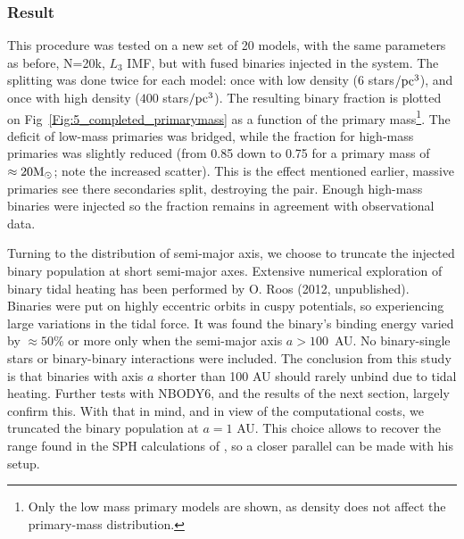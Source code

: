 \subsubsection*{Result}

This procedure was tested on a new set of 20 \HubLem models, with the same parameters as before, N=20k, $L_3$ IMF, but with fused binaries injected in the system. The splitting was done twice for each model:  once with low density ($6$ stars$/{\textrm{pc}}^3$), and once with high density ($ 400$ stars$/{\textrm{pc}}^3$). The resulting binary fraction is plotted on Fig~\ref{Fig:5_completed_primarymass} as a function of the primary mass\footnote{Only the low mass primary models are shown, as density does not affect the primary-mass distribution.}. The deficit of low-mass primaries was bridged, while the fraction for high-mass primaries was slightly reduced (from 0.85 down to 0.75 for a primary mass of $\approx 20 {\textrm{M}_\odot}$; note the increased scatter). This is the effect mentioned earlier, massive primaries see there secondaries split, destroying the pair. Enough high-mass binaries were injected so the fraction remains in agreement with observational data.

Turning to the distribution of semi-major axis, we choose to truncate the injected binary population at short semi-major axes. Extensive numerical exploration of binary tidal heating has been performed by O. Roos (2012, unpublished). Binaries were put on highly eccentric orbits in cuspy \cite{Dehnen1993} potentials, so experiencing large variations in the tidal force. It was found the binary's binding energy varied by $ \approx 50\%$ or more only when the semi-major axis $a >  100$~AU. No binary-single stars or binary-binary interactions were included. The conclusion from this study is that binaries with axis $a$ shorter than 100 AU should rarely unbind due to tidal heating. Further tests with NBODY6, and the results of the next section, largely confirm this. With that in mind, and in view of the computational costs, we truncated the binary population at $a = 1$ AU. This choice allows to recover the range found in the SPH calculations of \cite{Bate2012}, so a closer parallel can be made with his setup. 


